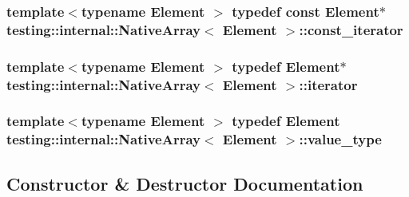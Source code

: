 \subsubsection[{\texorpdfstring{const\+\_\+iterator}{const_iterator}}]{\setlength{\rightskip}{0pt plus 5cm}template$<$typename Element $>$ typedef const Element$\ast$ {\bf testing\+::internal\+::\+Native\+Array}$<$ Element $>$\+::{\bf const\+\_\+iterator}}\hypertarget{classtesting_1_1internal_1_1_native_array_a9ce7c8408460d7158a2870456d134557}{}\label{classtesting_1_1internal_1_1_native_array_a9ce7c8408460d7158a2870456d134557}
\subsubsection[{\texorpdfstring{iterator}{iterator}}]{\setlength{\rightskip}{0pt plus 5cm}template$<$typename Element $>$ typedef Element$\ast$ {\bf testing\+::internal\+::\+Native\+Array}$<$ Element $>$\+::{\bf iterator}}\hypertarget{classtesting_1_1internal_1_1_native_array_ac1301a57977b57a1ad013e4e25fc2a72}{}\label{classtesting_1_1internal_1_1_native_array_ac1301a57977b57a1ad013e4e25fc2a72}
\subsubsection[{\texorpdfstring{value\+\_\+type}{value_type}}]{\setlength{\rightskip}{0pt plus 5cm}template$<$typename Element $>$ typedef Element {\bf testing\+::internal\+::\+Native\+Array}$<$ Element $>$\+::{\bf value\+\_\+type}}\hypertarget{classtesting_1_1internal_1_1_native_array_a12216d686e16e4cc63d952fada5b2ba9}{}\label{classtesting_1_1internal_1_1_native_array_a12216d686e16e4cc63d952fada5b2ba9}


\subsection{Constructor \& Destructor Documentation}
